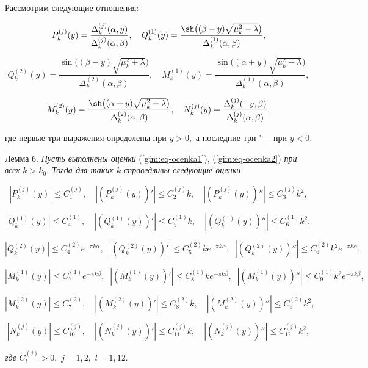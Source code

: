 Рассмотрим следующие отношения:

$$

P_k^{(j)}(y)=\frac{\Delta_k^{(j)}(\alpha,y)}{\Delta_k^{(j)}(\alpha,\beta)},\quad

Q_k^{(1)}(y)=\frac{\sh\big((\beta-y)\sqrt{\mu_k^2-\lambda}\big)}{\Delta_k^{(1)}(\alpha,\beta)},$$

$$

Q_k^{(2)}(y)=\frac{\sin\big((\beta-y)\sqrt{\mu_k^2+\lambda}\big)}{\Delta_k^{(2)}(\alpha,\beta)}, \quad 

M_k^{(1)}(y)=\frac{\sin\big((\alpha+y)\sqrt{\mu_k^2-\lambda}\big)}{\Delta_k^{(1)}(\alpha,\beta)},

$$ 

$$

M_k^{(2)}(y)=\frac{\sh\big((\alpha+y)\sqrt{\mu_k^2+\lambda}\big)}{\Delta_k^{(2)}(\alpha,\beta)},\quad 

N_k^{(j)}(y)=\frac{\Delta_k^{(j)}(-y,\beta)}{\Delta_k^{(j)}(\alpha,\beta)},$$

где первые три выражения определены при $y>0,$ а последние три "--- при $y<0.$



\smallskip



{\small\sc Лемма 6.} {\it Пусть выполнены оценки} (\ref{gim:eq-ocenka1}), (\ref{gim:eq-ocenka2}) {\it при всех $k>k_0.$ Тогда для таких $k$ справедливы следующие оценки}\/:

$$|P_k^{(j)}(y)|\le C_1^{(j)},\quad |(P_k^{(j)}(y))'|\le C_2^{(j)} k,\quad |(P_k^{(j)}(y))''|\le C_3^{(j)} k^2,$$

$$|Q_k^{(1)}(y)|\le C_4^{(1)},\quad |(Q_k^{(1)}(y))'|\le C_5^{(1)} k,\quad |(Q_k^{(1)}(y))''|\le C_6^{(1)}  k^2,$$

$$|Q_k^{(2)}(y)|\le C_4^{(2)} e^{-\pi k\alpha},\;\; |(Q_k^{(2)}(y))'|\le C_5^{(2)} k e^{-\pi k\alpha},\;\; |(Q_k^{(2)}(y))''|\le C_6^{(2)} k^2 e^{-\pi k\alpha},$$

$$|M_k^{(1)}(y)|\le C_7^{(1)} e^{-\pi k\beta},\;\; |(M_k^{(1)}(y))'|\le C_8^{(1)}  k e^{-\pi k\beta},\;\; |(M_k^{(1)}(y))''|\le C_9^{(1)} k^2 e^{-\pi k\beta},$$

$$|M_k^{(2)}(y)|\le C_7^{(2)},\quad |(M_k^{(2)}(y))'|\le C_8^{(2)} k,\quad |(M_k^{(2)}(y))''|\le C_9^{(2)} k^2,$$

$$|N_k^{(j)}(y)|\le C_{10}^{(j)},\quad |(N_k^{(j)}(y))'|\le C_{11}^{(j)} k,\quad |(N_k^{(j)}(y))''|\le C_{12}^{(j)} k^2,$$

{\it где} $C_{l}^{(j)}>0,$ $j=1, 2,$ $l=\overline{1, 12}.$



